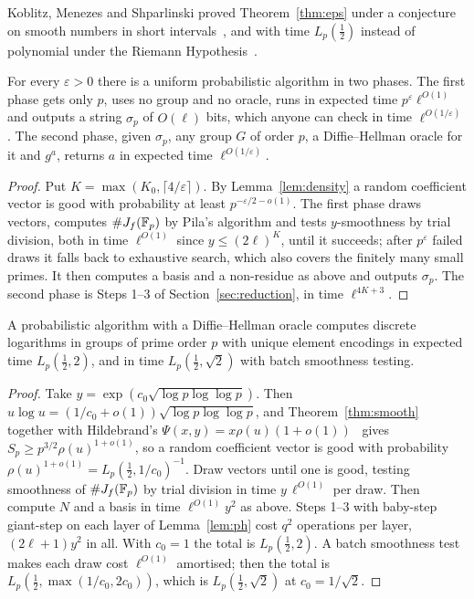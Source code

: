 Koblitz, Menezes and Shparlinski proved Theorem~\ref{thm:eps} under a conjecture on smooth numbers in short
intervals~\cite[Thm.~5]{KMS10}, and with time $L_p(\tfrac12)$ instead of polynomial under the Riemann
Hypothesis~\cite[Thm.~4]{KMS10}.

\begin{corollary}\label{cor:precomp}
For every $\varepsilon>0$ there is a uniform probabilistic algorithm in two phases. The first phase gets only
$p$, uses no group and no oracle, runs in expected time $p^{\varepsilon}\ell^{O(1)}$ and outputs a string
$\sigma_p$ of $O(\ell)$ bits, which anyone can check in time $\ell^{O(1/\varepsilon)}$. The second phase, given $\sigma_p$, any group $G$ of order $p$, a
Diffie--Hellman oracle for it and $g^a$, returns $a$ in expected time $\ell^{O(1/\varepsilon)}$.
\end{corollary}

\begin{proof}
Put $K=\max(K_0,\lceil4/\varepsilon\rceil)$. By Lemma~\ref{lem:density} a random coefficient vector is good with
probability at least $p^{-\varepsilon/2-o(1)}$. The first phase draws vectors, computes $\#J_f(\mathbb{F}_p)$ by Pila's
algorithm and tests $y$-smoothness by trial division, both in time $\ell^{O(1)}$ since $y\le(2\ell)^K$, until it
succeeds; after $p^\varepsilon$ failed draws it falls back to exhaustive search, which also covers the
finitely many small primes. It then computes a basis and a non-residue as above and outputs $\sigma_p$. The
second phase is Steps 1--3 of Section~\ref{sec:reduction}, in time $\ell^{4K+3}$.
\end{proof}

\begin{theorem}[No advice]\label{thm:uniform}
A probabilistic algorithm with a Diffie--Hellman oracle computes discrete logarithms in groups of prime order $p$ with unique element
encodings in expected time $L_p(\tfrac12,2)$, and in time $L_p(\tfrac12,\sqrt2)$ with batch smoothness
testing.
\end{theorem}

\begin{proof}
Take $y=\exp(c_0\sqrt{\log p\log\log p})$. Then $u\log u=(1/c_0+o(1))\sqrt{\log p\log\log p}$, and
Theorem~\ref{thm:smooth} together with Hildebrand's $\Psi(x,y)=x\rho(u)(1+o(1))$~\cite{Hil86} gives
$S_p\ge p^{3/2}\rho(u)^{1+o(1)}$, so a random coefficient vector is good with probability
$\rho(u)^{1+o(1)}=L_p(\tfrac12,1/c_0)^{-1}$. Draw vectors until one is good, testing smoothness of
$\#J_f(\mathbb{F}_p)$ by trial division in time $y\,\ell^{O(1)}$ per draw. Then compute $N$ and a basis in time
$\ell^{O(1)}y^2$ as above. Steps 1--3 with baby-step giant-step on each layer of Lemma~\ref{lem:ph} cost $q^2$
operations per layer, $(2\ell+1)y^2$ in all. With $c_0=1$ the total is $L_p(\tfrac12,2)$. A batch smoothness test~\cite{Ber04} makes each draw cost $\ell^{O(1)}$ amortised; then
the total is $L_p(\tfrac12,\max(1/c_0,2c_0))$, which is $L_p(\tfrac12,\sqrt2)$ at $c_0=1/\sqrt2$.
\end{proof}
